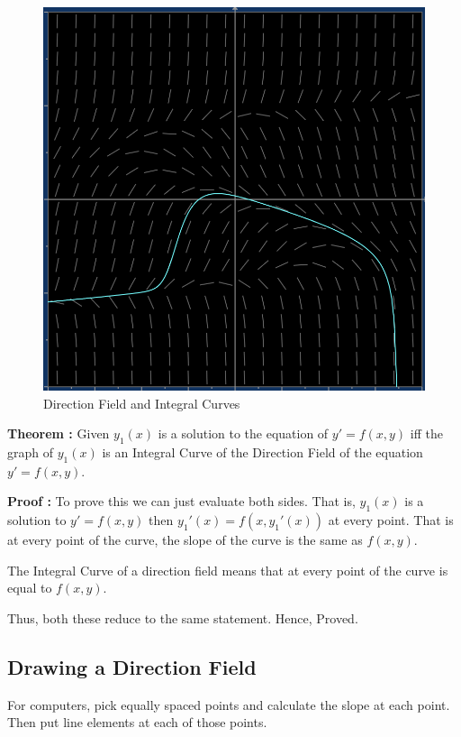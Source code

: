 \begin{figure}[ht!]
    \centering
    \includegraphics[scale=0.5]{./images/lecture_1_figure_1.png}
    \caption{Direction Field and Integral Curves}
\end{figure}

{\bf Theorem : } Given $y_1(x)$ is a solution to the equation of $y' = f(x, y)$
iff the graph of $y_1(x)$ is an Integral Curve of the Direction Field of the equation $y' = f(x, y)$.

{\bf Proof : } 
To prove this we can just evaluate both sides. That is, $y_1(x)$ is a solution to $y' = f(x, y)$ 
then $y_1'(x) = f(x, y_1'(x))$ at every point. 
That is at every point of the curve, the slope of the curve is the same as $f(x, y)$.

The Integral Curve of a direction field means that at every point of the curve is equal to $f(x, y)$.

Thus, both these reduce to the same statement. Hence, Proved.

\subsection{Drawing a Direction Field}

For computers, pick equally spaced points and calculate the slope at each point.
Then put line elements at each of those points.

